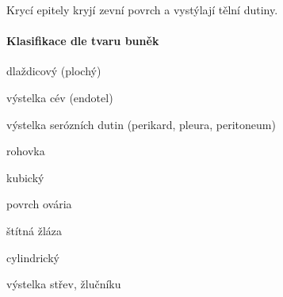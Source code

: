 \documentclass[DIV=8]{scrreprt}
\begin{document}
Krycí epitely kryjí zevní povrch a vystýlají tělní dutiny.

\paragraph{Klasifikace dle tvaru buněk}
\begin{myItemize}[nosep]
    \item dlaždicový (plochý)
\begin{myItemize}[nosep]
    \item výstelka cév (endotel)
    \item výstelka serózních dutin (perikard, pleura, peritoneum)
    \item rohovka
\end{myItemize}

    \item kubický
\begin{myItemize}[nosep]
    \item povrch ovária
    \item štítná žláza
\end{myItemize}

    \item cylindrický
\begin{myItemize}[nosep]
    \item výstelka střev, žlučníku
\end{myItemize}

\end{myItemize}
\end{document}

